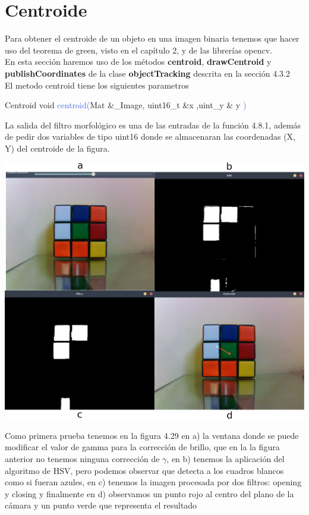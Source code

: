 \section{Centroide}
Para obtener el centroide de un objeto en una imagen binaria tenemos que hacer uso del
teorema de green, visto en el capítulo 2, y de las librerías opencv.\\
En esta sección haremos uso de los métodos \textbf{centroid}, \textbf{drawCentroid} y \textbf{publishCoordinates} de la clase
\textbf{objectTracking} descrita en la sección 4.3.2\\
El metodo centroid tiene los siguientes parametros
\begin{example}[label={ex:serie}]{Centroid}
	\textcolor{Mulberry}{void} \textcolor{RoyalBlue}{centroid(}\textcolor{BurntOrange}{Mat}
	\textcolor{Mulberry}{\&}\textcolor{Bittersweet}{\_Image}, \textcolor{BurntOrange}{uint16\_t} \textcolor{Mulberry}{\&}\textcolor{Bittersweet}{x}
	,\textcolor{BurntOrange}{uint\_y} \textcolor{Mulberry}{\&} \textcolor{Bittersweet}{y}
	\textcolor{RoyalBlue}{)}
\end{example}
La salida del filtro morfológico es una de las entradas de la función 4.8.1, además de pedir dos variables de tipo uint16 donde
se almacenaran las coordenadas (X, Y) del centroide de la figura.
\begin{center}
	\includegraphics[width=0.45 \textwidth]{Contenido/Cuerpo/Capitulo4/Fig25.eps}
	\label{Fig9}
\end{center}
Como primera prueba tenemos en la figura 4.29 en a) la ventana donde se puede modificar el valor de gamma para la corrección de brillo, que en la
la figura anterior no tenemos ninguna corrección de $\gamma$, en b) tenemos la aplicación del algoritmo de HSV, pero podemos
observar que detecta a los cuadros blancos como si fueran azules, en c) tenemos la imagen procesada por dos filtros: opening
y closing y finalmente en d) observamos un punto rojo al centro del plano de la cámara y un punto verde que representa el resultado
